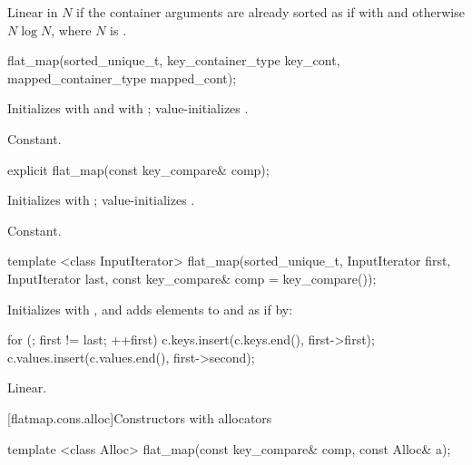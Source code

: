 \begin{codeblock}
\begin{codeblock}
\begin{codeblock}
\begin{addedblock}
\begin{itemdescr}
\pnum
\complexity
Linear in $N$ if the container arguments are already sorted as if
with  and otherwise $N \log N$, where $N$
is .
\end{itemdescr}

%
\begin{itemdecl}
flat_map(sorted_unique_t, key_container_type key_cont, mapped_container_type mapped_cont);
\end{itemdecl}

\begin{itemdescr}
\pnum
\effects Initializes  with
 and  with
; value-initializes .

\pnum
\complexity
Constant.
\end{itemdescr}

\begin{itemdecl}
explicit flat_map(const key_compare& comp);
\end{itemdecl}

\begin{itemdescr}
\pnum
\effects Initializes  with ; value-initializes .

\pnum
\complexity
Constant.
\end{itemdescr}

%
\begin{itemdecl}
template <class InputIterator>
  flat_map(sorted_unique_t, InputIterator first, InputIterator last,
           const key_compare& comp = key_compare());
\end{itemdecl}

\begin{itemdescr}
\pnum
\effects Initializes  with
, and adds elements to  and  as if by:
\begin{codeblock}
for (; first != last; ++first) {
  c.keys.insert(c.keys.end(), first->first);
  c.values.insert(c.values.end(), first->second);
}
\end{codeblock}

\pnum
\complexity
Linear.
\end{itemdescr}

[flatmap.cons.alloc]{Constructors with allocators}

%
\begin{itemdecl}
template <class Alloc>
  flat_map(const key_compare& comp, const Alloc& a);
\end{itemdecl}


\end{addedblock}
\end{codeblock}
\end{codeblock}
\end{codeblock}
